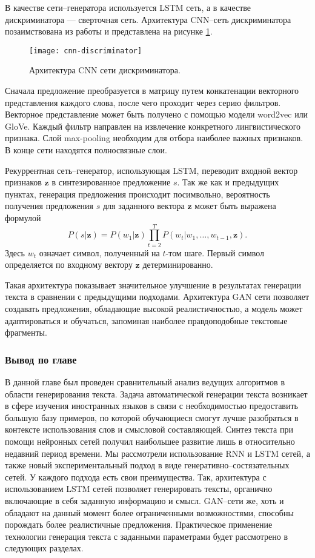 В качестве сети--генератора используется LSTM сеть, а в качестве дискриминатора --- сверточная сеть. Архитектура CNN--сеть дискриминатора позаимствована из работы \cite{zhang2015sensitivity} и представлена на рисунке \ref{fig:cnn-discriminator}.

\begin{figure}[h]
	\centering
	\texttt{[image: cnn-discriminator]}
	\caption{Архитектура CNN сети дискриминатора.}
	\label{fig:cnn-discriminator}
\end{figure}

Сначала предложение преобразуется в матрицу путем конкатенации векторного представления каждого слова, после чего проходит через серию фильтров. Векторное представление может быть получено с помощью модели word2vec\cite{mikolov2013distributed} или GloVe\cite{pennington2014glove}. Каждый фильтр направлен на извлечение конкретного лингвистического признака. Слой max-pooling необходим для отбора наиболее важных признаков. В конце сети находятся полносвязные слои.

Рекуррентная сеть--генератор, использующая LSTM, переводит входной вектор признаков $\mathbf{z}$ в синтезированное предложение $s$. Так же как и предыдущих пунктах, генерация предложения происходит посимвольно, вероятность получения предложения $s$ для заданного вектора $\mathbf{z}$ может быть выражена формулой
$$P(s | \mathbf{z}) = P(w_1 | \mathbf{z}) \prod_{t=2}^{T} P(w_t | w_1, \dots, w_{t - 1}, \mathbf{z}).$$
Здесь $w_t$ означает символ, полученный на $t$-том шаге. Первый символ определяется по входному вектору $\mathbf{z}$ детерминированно.

Такая архитектура показывает\cite{zhang2017adversarial} значительное улучшение в результатах генерации текста в сравнении с предыдущими подходами. Архитектура GAN сети позволяет создавать предложения, обладающие высокой реалистичностью, а модель может адаптироваться и обучаться, запоминая наиболее правдоподобные текстовые фрагменты.

\subsubsection{Вывод по главе}
В данной главе был проведен сравнительный анализ ведущих алгоритмов в области генерирования текста. Задача автоматической генерации текста возникает в сфере изучения иностранных языков в связи с необходимостью предоставить большую базу примеров, по которой обучающиеся смогут лучше разобраться в контексте использования слов и смысловой составляющей. Синтез текста при помощи нейронных сетей получил наибольшее развитие лишь в относительно недавний период времени. Мы рассмотрели использование RNN и LSTM сетей, а также новый экспериментальный подход в виде генеративно--состязательных сетей. У каждого подхода есть свои преимущества. Так, архитектура с использованием LSTM сетей позволяет генерировать тексты, органично включающие в себя заданную информацию и смысл. GAN--сети же, хоть и обладают на данный момент более ограниченными возможностями, способны порождать более реалистичные предложения. Практическое применение технологии генерация текста с заданными параметрами будет рассмотрено в следующих разделах.
